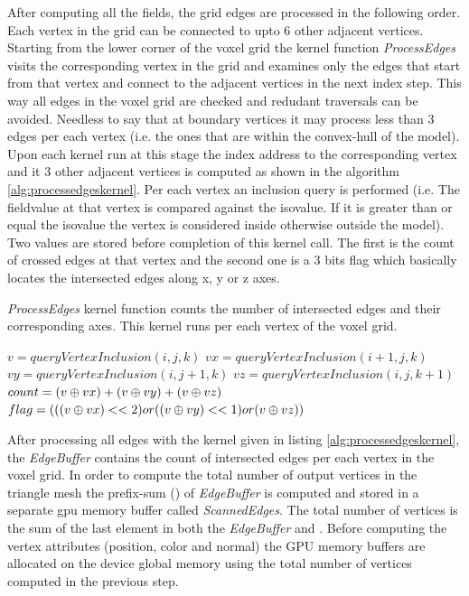 After computing all the fields, the grid edges are processed in the following order. 
Each vertex in the grid can be connected to upto 6 other adjacent vertices. Starting from the lower corner of the voxel grid 
the kernel function \textit{ProcessEdges} visits the corresponding vertex in the grid and examines only the edges that start 
from that vertex and connect to the adjacent vertices in the next index step. This way all edges in the voxel grid are checked 
and redudant traversals can be avoided. Needless to say that at boundary vertices it may process less than 3 edges per each 
vertex (i.e. the ones that are within the convex-hull of the model). Upon each kernel run at this stage the index address to 
the corresponding vertex and it 3 other adjacent vertices is computed as shown in the algorithm \ref{alg:processedgeskernel}. Per each vertex
an inclusion query is performed (i.e. The fieldvalue at that vertex is compared against the isovalue. If it is greater than or equal 
the isovalue the vertex is considered inside otherwise outside the model). Two values are stored before completion of this kernel call. 
The first is the count of crossed edges at that vertex and the second one is a 3 bits flag which basically locates the intersected 
edges along x, y or z axes.


\begin{algorithm}[H]
\caption{\textit{ProcessEdges} kernel function counts the number of intersected edges and their corresponding axes. This kernel runs per each
vertex of the voxel grid.}
\label{alg:processedgeskernel}
\begin{algorithmic}[1]	
  \STATE $v = queryVertexInclusion(i, j, k)$
  \STATE $vx = queryVertexInclusion(i+1, j, k)$
  \STATE $vy = queryVertexInclusion(i, j+1, k)$
  \STATE $vz = queryVertexInclusion(i, j, k+1)$
  \STATE $count = (v \mathbin{\oplus} vx) + (v \mathbin{\oplus} vy) + (v \mathbin{\oplus} vz)$
  \STATE $flag = (((v \mathbin{\oplus} vx) << 2) or ((v \mathbin{\oplus} vy) << 1) or (v \mathbin{\oplus} vz))$
\end{algorithmic}
\end{algorithm}


After processing all edges with the kernel given in listing \ref{alg:processedgeskernel}, the \textit{EdgeBuffer} 
contains the count of intersected edges per each vertex in the voxel grid. In order to compute the total number of 
output vertices in the triangle mesh the prefix-sum (\cite{Sengupta2007}) of \textit{EdgeBuffer} is computed and
stored in a separate gpu memory buffer called \textit{ScannedEdges}. The total number of vertices is the sum of the
last element in both the \textit{EdgeBuffer} and . Before computing the vertex 
attributes (position, color and normal) the GPU memory buffers are allocated on the device global memory using the total number 
of vertices computed in the previous step. 

